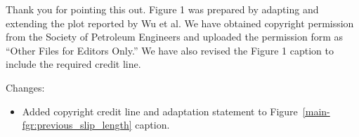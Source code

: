 ﻿\documentclass{article}
\newcommand{\Changes}{\par\vspace{0.75\baselineskip}\noindent Changes:}
\begin{document}
Thank you for pointing this out. Figure 1 was prepared by adapting and extending the plot reported by Wu et al. We have obtained copyright permission from the Society of Petroleum Engineers and uploaded the permission form as “Other Files for Editors Only.” We have also revised the Figure 1 caption to include the required credit line.

\Changes
\begin{itemize}
  \item Added copyright credit line and adaptation statement to Figure~\ref{main-fgr:previous_slip_length} caption.
\end{itemize}
\end{document}
